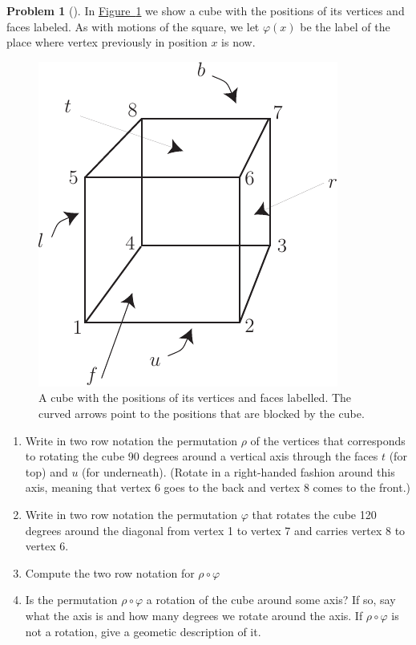 \documentclass[10pt,]{book}
\theoremstyle{plain}
\theoremstyle{definition}
\newtheorem{activity}[project]{Problem}
\theoremstyle{definition}
\numberwithin{equation}{chapter}
\begin{document}
\begin{activity}[]\marginsymbol[-1em]{} \label{cube1-prob}
In \hyperref[cube1]{Figure~\ref{cube1}} we show a cube with the positions of its vertices and faces labeled.  As with motions of the square, we let \(\varphi(x)\) be the label of the place where vertex previously in position \(x\) is now.%
\begin{figure}
\centering
\includegraphics[width=0.5\linewidth]{images/cube1}
\caption{A cube with the positions of its vertices and faces labelled.  The curved arrows point to the positions that are blocked by the cube.\label{cube1}}
\end{figure}
\begin{enumerate}[font=\bfseries,label=(\alph*),ref=\alph*]
\item\label{task-193} \marginsymbol[-2.5em]{} Write in two row notation the permutation \(\rho\) of the vertices that corresponds to rotating the cube 90 degrees around a vertical axis through the faces \(t\) (for top) and \(u\) (for underneath). (Rotate in a right-handed fashion around this axis, meaning that vertex 6 goes to the back and vertex 8 comes to the front.)%
\item\label{task-194} \marginsymbol[-2.5em]{} Write in two row notation the permutation \(\varphi\) that rotates the cube 120 degrees around the diagonal from vertex 1 to vertex 7 and carries vertex 8 to vertex 6.%
\item\label{task-195} \marginsymbol[-2.5em]{} Compute the two row notation for \(\rho \circ \varphi\)%
\item\label{task-196} \marginsymbol[-2.5em]{} Is the permutation \(\rho\circ\varphi\) a rotation of the cube around some axis?  If so, say what the axis is and how many degrees we rotate around the axis.  If \(\rho\circ\varphi\) is not a rotation, give a geometic description of it.%
\end{enumerate}
\end{activity}
\end{document}

